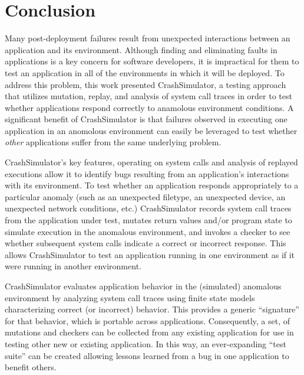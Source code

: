 \section{Conclusion}

Many post-deployment failures result from
unexpected interactions between an application and its environment.
Although finding and eliminating faults in applications is a key concern for software developers, it is impractical for them to test an application in all of the
environments in which it will be deployed.
 To address this
problem, this work presented CrashSimulator, a testing
approach that utilizes mutation, replay, and analysis of system call traces
in order to test whether applications respond correctly to 
anamolous environment conditions.
A significant benefit of CrashSimulator is that failures observed
in executing one application in an anomolous environment can
easily be leveraged to test whether {\em other} applications
suffer from the same underlying problem.

CrashSimulator's key features, operating on system calls and analysis of replayed executions allow it to identify bugs
resulting from an application's interactions with its environment.
To test whether an application responds appropriately to a particular
anomaly (such as an unexpected filetype, an unexpected device, an unexpected
network conditions, etc.)
CrashSimulator records system call traces from the application under test,
mutates return values and/or program state to simulate execution in 
the anomalous environment, and invokes a checker to see whether
subsequent system calls indicate a correct or incorrect response.
This allows
CrashSimulator to test an application running in one environment
as if it were running in another environment. 


CrashSimulator evaluates application behavior in the (simulated) anomalous environment
by analyzing system call traces using
finite state models characterizing correct (or incorrect) behavior.
This provides a generic ``signature'' for that behavior, which is
portable across applications. 
Consequently, a set, of mutations and checkers can be collected from any existing
application for use in testing other new or existing application. 
In this way, an ever-expanding ``test suite'' can
be created allowing lessons learned from a bug in one application to benefit others.

